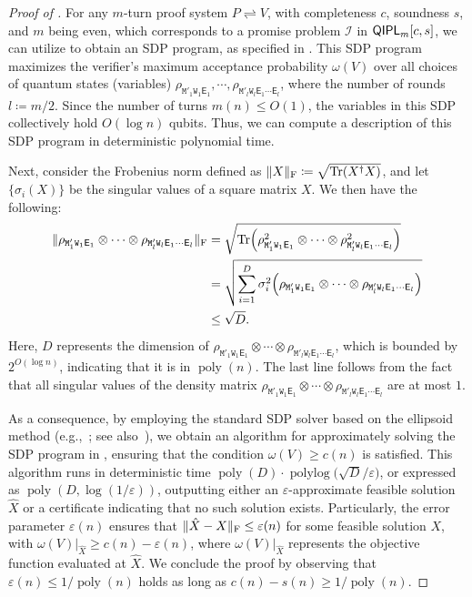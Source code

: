 \documentclass[10pt,a4paper]{article}
\numberwithin{equation}{section}
\numberwithin{figure}{section}
\newcommand{\QIPL}{\textnormal{\textsf{QIPL}}\xspace}
\newcommand{\protocol}[2]{{#1}\!\rightleftharpoons\!{#2}}
\DeclarePairedDelimiter\rbra{\lparen}{\rparen}
\DeclarePairedDelimiter\norm{\lVert}{\rVert}
\newcommand{\Tr}{\mathrm{Tr}}
\DeclareMathOperator\poly{poly}
\DeclareMathOperator\polylog{polylog}
\newcommand{\calI}{\mathcal{I}}
\newcommand{\sfE}{\mathsf{E}}
\newcommand{\ttM}{\mathtt{M}}
\newcommand{\ttW}{\mathtt{W}}
\begin{document}
\begin{proof}[Proof of ]
    For any $m$-turn proof system $\protocol{P}{V}$, with completeness $c$, soundness $s$, and $m$ being even, which corresponds to a promise problem $\calI$ in $\QIPL_m[c,s]$, we can utilize  to obtain an SDP program, as specified in .
    This SDP program maximizes the verifier's maximum acceptance probability $\omega(V)$ over all choices of quantum states (variables) $\rho_{\ttM'_1\ttW_1\sfE_1}, \cdots, \rho_{\ttM'_l\ttW_l\sfE_1\cdots\sfE_l}$, where the number of rounds $l \coloneqq m/2$. 
    Since the number of turns $m(n) \leq O(1)$, the variables in this SDP collectively hold $O(\log{n})$ qubits. Thus, we can compute a description of this SDP program in deterministic polynomial time. 
    
    Next, consider the Frobenius norm defined as $\norm{X}_{\rm F} \coloneqq \sqrt{\Tr\rbra*{X^\dagger X}}$, and let $\{\sigma_i(X)\}$ be the singular values of a square matrix $X$. We then have the following: 
    \begin{align*}
        \norm{ \rho_{\ttM'_1\ttW_1\sfE_1} \otimes \cdots \otimes \rho_{\ttM'_l\ttW_l\sfE_1\cdots\sfE_l} }_{\rm F} 
        &=\sqrt{\Tr\rbra*{\rho_{\ttM'_1\ttW_1\sfE_1}^2 \otimes \cdots \otimes \rho_{\ttM'_l\ttW_l\sfE_1\cdots\sfE_l}^2}}\\
        &=\sqrt{ \sum_{i=1}^D \sigma^2_i\rbra*{ \rho_{\ttM'_1\ttW_1\sfE_1} \otimes \cdots \otimes \rho_{\ttM'_l\ttW_l\sfE_1\cdots\sfE_l} } }\\
        &\leq \sqrt{D}. 
    \end{align*}
    Here, $D$ represents the dimension of $\rho_{\ttM'_1\ttW_1\sfE_1} \otimes \cdots \otimes \rho_{\ttM'_l\ttW_l\sfE_1\cdots\sfE_l}$, which is bounded by $2^{O(\log n)}$, indicating that it is in $\poly(n)$. The last line follows from the fact that all singular values of the density matrix $\rho_{\ttM'_1\ttW_1\sfE_1} \otimes \cdots \otimes \rho_{\ttM'_l\ttW_l\sfE_1\cdots\sfE_l}$ are at most $1$. 
    
    As a consequence, by employing the standard SDP solver based on the ellipsoid method  (e.g.,~\cite[Theorem 2.6.1]{GM12}; see also~\cite[Chapter 3]{GLS93}), we obtain an  algorithm for approximately solving the SDP program in , ensuring that the condition $\omega(V) \geq c(n)$ is satisfied. This algorithm runs in deterministic time $\poly(D) \cdot \polylog\big(\sqrt{D}/\varepsilon\big)$, or expressed as $\poly(D,\log(1/\varepsilon))$, outputting either an $\varepsilon$-approximate feasible solution $\hat{X}$ or a certificate indicating that no such solution exists. Particularly, the error parameter $\varepsilon(n)$ ensures that $\norm{\hat{X} - X}_{\rm F} \leq \varepsilon(n)$ for some feasible solution $X$, with $\omega(V)|_{\hat{X}} \geq c(n) - \varepsilon(n)$, where $\omega(V)|_{\hat{X}}$ represents the objective function evaluated at $\hat{X}$. 
    We conclude the proof by observing that $\varepsilon(n) \leq 1/\poly(n)$ holds as long as $c(n)-s(n) \geq 1/\poly(n)$. 
\end{proof}
\end{document}
